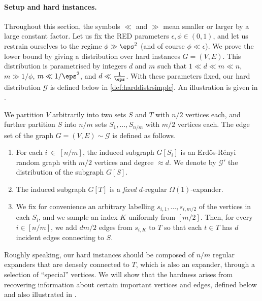 \paragraph*{Setup and hard instances.}
Throughout this section, the symbols $\ll$ and $\gg$ mean smaller or larger by a large constant factor. Let us fix the RED parameters $\epsilon, \phi\in (0,1)$, and let us restrain ourselves to the regime $\phi \gg \eps^2$ (and of course $\phi \ll \epsilon$). We prove the lower bound by giving a distribution over hard instances $G=(V, E)$. This distribution is parametrised by integers $d$ and $m$ such that $1 \ll d \ll m \ll n$, $m \gg 1/\phi$, $ m \ll 1/\eps^2$, and $d \ll \frac{1}{\eps}$. With these parameters fixed, our hard distribution $\mathcal{G}$ is defined below in \cref{def:harddistrsimple}. An illustration is given in .



\begin{definition}
	\label{def:harddistrsimple}
 We partition $V$ arbitrarily  into two sets $S$ and $T$ with $n/2$ vertices each, and further partition $S$ into $n/m$ sets $S_1,\dots,S_{n/m}$ with $m/2$ vertices each. The edge set of the graph $G=(V,E) \sim \mathcal{G}$ is defined as follows.

\begin{enumerate}
    \item  For each $i~\in~[n/m]$, the induced subgraph $G[S_i]$ is an Erd\H{o}s-R\'{e}nyi random graph with $m/2$ vertices and degree $\approx d$. We denote by $\mathcal{G}'$ the distribution of the subgraph $G[S]$.

\item The induced subgraph $G[T]$ is a {\em fixed} $d$-regular $ \Omega(1)$-expander.

\item We fix for convenience an arbitrary labelling $s_{i,1},\dots,s_{i,m/2}$ of the vertices in each $S_i$, and we sample an index $K$ uniformly from $[m/2]$. Then, for every $i\in [n/m]$, we add $dm/2$ edges from $s_{i,K}$ to $T$ so that each $t \in T$ has $d$ incident edges connecting to $S$.
\end{enumerate}

\end{definition}
\noindent
Roughly speaking, our hard instances should be composed of $n/m$ regular expanders that are densely connected to $T$, which is also an expander, through a selection of ``special'' vertices. We will show that the hardness arises from recovering information about certain important vertices and edges, defined below and also illustrated in .

